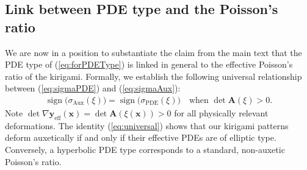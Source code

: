 \documentclass[aps,11pt,tightenlines,notitlepage,superscriptaddress,longbibliography,nofootinbib]{revtex4-1}
\DeclareMathOperator{\sign}{sign}
\begin{document}
\subsection{Link between  PDE type and the Poisson's ratio}
We are now in a position to substantiate the claim from the main text that the PDE type of (\ref{eq:forPDEType}) is linked in general to the effective Poisson's ratio of the kirigami.
Formally, we establish the following universal relationship between (\ref{eq:sigmaPDE}) and (\ref{eq:sigmaAux}):
\begin{equation}
    \begin{aligned}\label{eq:universal}
    \sign\big(\sigma_{\text{Aux}}(\xi)\big) =  \sign \big( \sigma_{\text{PDE}}(\xi)\big) \quad \text{when $\det \mathbf{A}(\xi) >0$}.
    \end{aligned}
\end{equation}
Note $\det \nabla \mathbf{y}_{\text{eff}}(\mathbf{x}) = \det \mathbf{A}(\xi(\mathbf{x})) > 0$  for all physically relevant deformations. The identity (\ref{eq:universal}) shows that our kirigami patterns deform auxetically if and only if their effective PDEs are of elliptic type. Conversely, a hyperbolic PDE type corresponds to a standard, non-auxetic Poisson's ratio.  %
\end{document}
